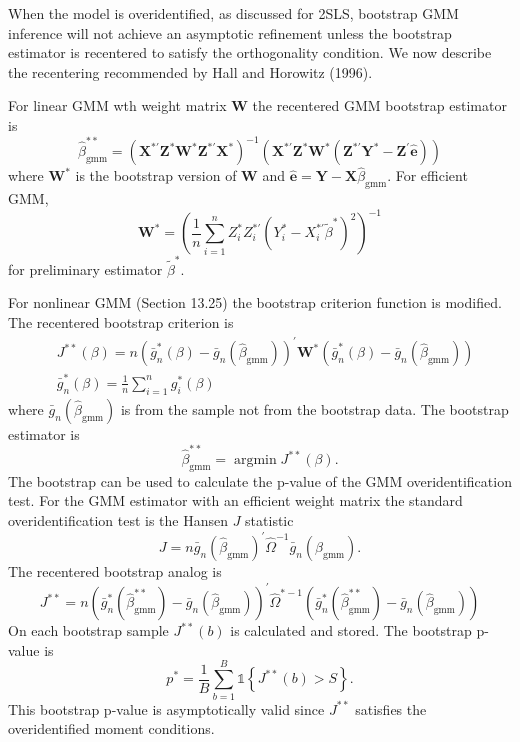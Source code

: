 \documentclass[10pt]{article}
\begin{document}
When the model is overidentified, as discussed for 2SLS, bootstrap GMM inference will not achieve an asymptotic refinement unless the bootstrap estimator is recentered to satisfy the orthogonality condition. We now describe the recentering recommended by Hall and Horowitz (1996).

For linear GMM wth weight matrix $\boldsymbol{W}$ the recentered GMM bootstrap estimator is
$$
\widehat{\beta}_{\mathrm{gmm}}^{* *}=\left(\boldsymbol{X}^{* \prime} \boldsymbol{Z}^{*} \boldsymbol{W}^{*} \boldsymbol{Z}^{* \prime} \boldsymbol{X}^{*}\right)^{-1}\left(\boldsymbol{X}^{* \prime} \boldsymbol{Z}^{*} \boldsymbol{W}^{*}\left(\boldsymbol{Z}^{* \prime} \boldsymbol{Y}^{*}-\boldsymbol{Z}^{\prime} \widehat{\boldsymbol{e}}\right)\right)
$$
where $\boldsymbol{W}^{*}$ is the bootstrap version of $\boldsymbol{W}$ and $\widehat{\boldsymbol{e}}=\boldsymbol{Y}-\boldsymbol{X} \widehat{\beta}_{\mathrm{gmm}}$. For efficient GMM,
$$
\boldsymbol{W}^{*}=\left(\frac{1}{n} \sum_{i=1}^{n} Z_{i}^{*} Z_{i}^{* \prime}\left(Y_{i}^{*}-X_{i}^{* \prime} \widetilde{\beta}^{*}\right)^{2}\right)^{-1}
$$
for preliminary estimator $\widetilde{\beta}^{*}$.

For nonlinear GMM (Section 13.25) the bootstrap criterion function is modified. The recentered bootstrap criterion is
$$
\begin{aligned}
&J^{* *}(\beta)=n\left(\bar{g}_{n}^{*}(\beta)-\bar{g}_{n}\left(\widehat{\beta}_{\mathrm{gmm}}\right)\right)^{\prime} \boldsymbol{W}^{*}\left(\bar{g}_{n}^{*}(\beta)-\bar{g}_{n}\left(\widehat{\beta}_{\mathrm{gmm}}\right)\right) \\
&\bar{g}_{n}^{*}(\beta)=\frac{1}{n} \sum_{i=1}^{n} g_{i}^{*}(\beta)
\end{aligned}
$$
where $\bar{g}_{n}\left(\widehat{\beta}_{\mathrm{gmm}}\right)$ is from the sample not from the bootstrap data. The bootstrap estimator is
$$
\widehat{\beta}_{\mathrm{gmm}}^{* *}=\operatorname{argmin} J^{* *}(\beta) .
$$
The bootstrap can be used to calculate the p-value of the GMM overidentification test. For the GMM estimator with an efficient weight matrix the standard overidentification test is the Hansen $J$ statistic
$$
J=n \bar{g}_{n}\left(\widehat{\beta}_{\mathrm{gmm}}\right)^{\prime} \widehat{\Omega}^{-1} \bar{g}_{n}\left(\widehat{\beta}_{\mathrm{gmm}}\right) .
$$
The recentered bootstrap analog is
$$
J^{* *}=n\left(\bar{g}_{n}^{*}\left(\widehat{\beta}_{\mathrm{gmm}}^{* *}\right)-\bar{g}_{n}\left(\widehat{\beta}_{\mathrm{gmm}}\right)\right)^{\prime} \widehat{\Omega}^{*-1}\left(\bar{g}_{n}^{*}\left(\widehat{\beta}_{\mathrm{gmm}}^{* *}\right)-\bar{g}_{n}\left(\widehat{\beta}_{\mathrm{gmm}}\right)\right)
$$
On each bootstrap sample $J^{* *}(b)$ is calculated and stored. The bootstrap p-value is
$$
p^{*}=\frac{1}{B} \sum_{b=1}^{B} \mathbb{1}\left\{J^{* *}(b)>S\right\} .
$$
This bootstrap p-value is asymptotically valid since $J^{* *}$ satisfies the overidentified moment conditions.
\end{document}
